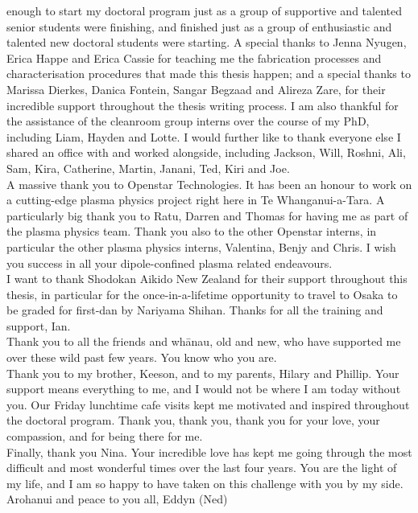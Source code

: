 \documentclass[
  a4paper,
]{scrbook}
\begin{document}
enough to start my doctoral program just as a group of supportive and talented senior students were finishing, and finished just as a group of enthusiastic and talented new doctoral students were starting. A special thanks to Jenna Nyugen, Erica Happe and Erica Cassie for teaching me the fabrication processes and characterisation procedures that made this thesis happen; and a special thanks to Marissa Dierkes, Danica Fontein, Sangar Begzaad and Alireza Zare, for their incredible support throughout the thesis writing process. I am also thankful for the assistance of the cleanroom group interns over the course of my PhD, including Liam, Hayden and Lotte. I would further like to thank everyone else I shared an office with and worked alongside, including Jackson, Will, Roshni, Ali, Sam, Kira, Catherine, Martin, Janani, Ted, Kiri and Joe. \\[5pt] A massive thank you to Openstar Technologies. It has been an honour to work on a cutting-edge plasma physics project right here in Te Whanganui-a-Tara. A particularly big thank you to Ratu, Darren and Thomas for having me as part of the plasma physics team. Thank you also to the other Openstar interns, in particular the other plasma physics interns, Valentina, Benjy and Chris. I wish you success in all your dipole-confined plasma related endeavours. \\[5pt] I want to thank Shodokan Aikido New Zealand for their support throughout this thesis, in particular for the once-in-a-lifetime opportunity to travel to Osaka to be graded for first-dan by Nariyama Shihan. Thanks for all the training and support, Ian. \\[5pt] Thank you to all the friends and whānau, old and new, who have supported me over these wild past few years. You know who you are. \\[5pt] Thank you to my brother, Keeson, and to my parents, Hilary and Phillip. Your support means everything to me, and I would not be where I am today without you. Our Friday lunchtime cafe visits kept me motivated and inspired throughout the doctoral program. Thank you, thank you, thank you for your love, your compassion, and for being there for me. \\[5pt] Finally, thank you Nina. Your incredible love has kept me going through the most difficult and most wonderful times over the last four years. You are the light of my life, and I am so happy to have taken on this challenge with you by my side. \\[5pt] Arohanui and peace to you all, Eddyn (Ned)
\end{document}
